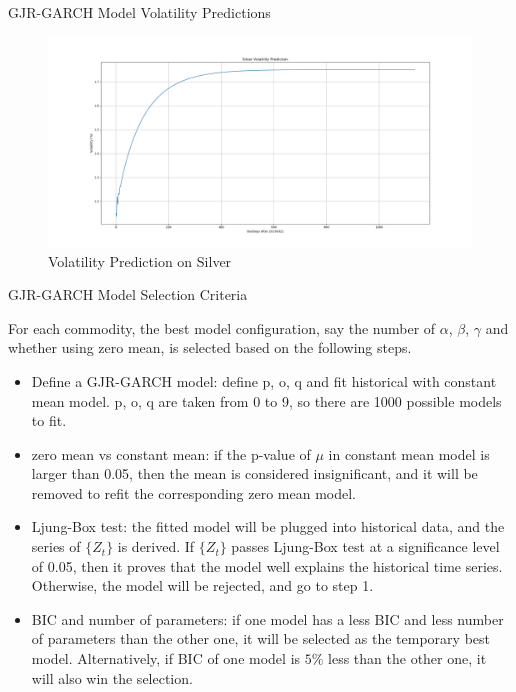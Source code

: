 \documentclass[8pt]{beamer}
\numberwithin{equation}{section}
\begin{document}
\begin{frame}{GJR-GARCH Model Volatility Predictions}

\begin{figure}[!ht]
	\includegraphics[width=\linewidth]{Silvervol.png} %
	\caption{Volatility Prediction on Silver} %
	\label{silver pred} %
\end{figure}

\end{frame}

\begin{frame}{GJR-GARCH Model Selection Criteria}

For each commodity, the best model configuration, say the number of $\alpha$, $\beta$, $\gamma$ and whether using zero mean, is selected based on the following steps.

\begin{itemize}
	\item  Define a GJR-GARCH model: define p, o, q and fit historical with constant mean model. p, o, q are taken from 0 to 9, so there are 1000 possible models to fit.
	\item zero mean vs constant mean: if the p-value of $\mu$ in constant mean model is larger than 0.05, then the mean is considered insignificant, and it will be removed to refit the corresponding zero mean model.
	\item Ljung-Box test: the fitted model will be plugged into historical data, and the series of $\{ Z_t\}$ is derived. If $\{ Z_t\}$ passes Ljung-Box test at a significance level of 0.05, then it proves that the model well explains the historical time series. Otherwise, the model will be rejected, and go to step 1.
	\item BIC and number of parameters: if one model has a less BIC and less number of parameters than the other one, it will be selected as the temporary best model. Alternatively, if BIC of one model is $5\%$ less than the other one, it will also win the selection.
\end{itemize}

\end{frame}
\end{document}
